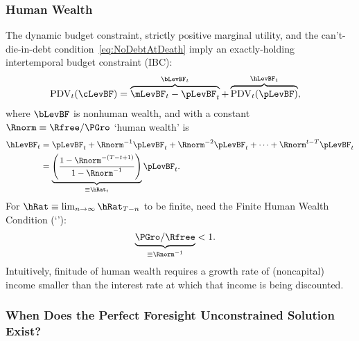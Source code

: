 \documentclass[BufferStockTheory]{subfiles}
\begin{document}
\subsubsection{Human Wealth}
The dynamic budget constraint, strictly positive marginal utility, and the can't-die-in-debt condition~\eqref{eq:NoDebtAtDeath} imply an exactly-holding intertemporal budget constraint (IBC):
\begin{align}
  \mathrm{PDV}_{t}(\cLevBF)  & = \overbrace{\mLevBF_{t}-\pLevBF_{t}}^{\bLevBF_{t}}+\overbrace{\mathrm{PDV}_{t}(\pLevBF)}^{\hLevBF_{t}}, \label{eq:IBCFinite}
\end{align} \hypertarget{FHWF}{}
where $\bLevBF$ is nonhuman wealth, and with a constant $\Rnorm \equiv \Rfree/\PGro$ `human wealth' is
\begin{align}
  \hLevBF_{t}  & = \pLevBF_{t}+\Rnorm^{-1} \pLevBF_{t} + \Rnorm^{-2} \pLevBF_{t} + \cdots + \Rnorm^{t-T} \pLevBF_{t} \notag
  \\  & = \underbrace{\left(\frac{1-\Rnorm^{-(T-t+1)}}{1-\Rnorm^{-1}}\right)}_{\equiv \hRat_{t}}\pLevBF_{t} \label{eq:HDef}.
\end{align}\hypertarget{FHWC}{}
For $\hRat \equiv \lim_{n \rightarrow \infty} \hRat_{T-n}$ to be finite, need the Finite Human Wealth Condition (`\FHWC'):
\begin{align}
  \underbrace{\PGro/\Rfree}_{\equiv \Rnorm^{-1}}  & < 1 \label{eq:FHWC}.
\end{align}
Intuitively, finitude of human wealth requires a growth rate of (noncapital) income smaller than the interest rate at which that income is being discounted.

\hypertarget{Unconstrained-Solution}{}\hypertarget{PF-Unconstrained-Solution}{}
\subsubsection{When Does the Perfect Foresight Unconstrained Solution Exist?}\label{subsec:PFUncon}
\hypertarget{APF}{}\hypertarget{AIC}{}
\end{document}

